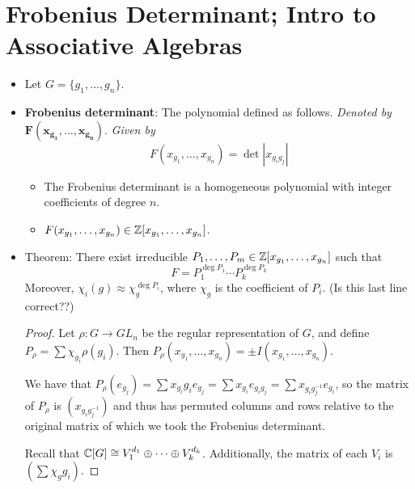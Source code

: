 \documentclass[../notes.tex]{subfiles}
\begin{document}
\section{Frobenius Determinant; Intro to Associative Algebras}
\begin{itemize}
    \item {}Let $G=\{g_1,\dots,g_n\}$.
    \item \textbf{Frobenius determinant}: The polynomial defined as follows. \emph{Denoted by} $\bm{F(x_{g_1},\ldots,x_{g_n})}$. \emph{Given by}
    \begin{equation*}
        F(x_{g_1},\dots,x_{g_n}) = \det|x_{g_ig_j}|
    \end{equation*}
    \begin{itemize}
        \item The Frobenius determinant is a homogeneous polynomial with integer coefficients of degree $n$.
        \item $F(x_{g_1},\dots,x_{g_n})\in\mathbb{Z}[x_{g_1},\dots,x_{g_n}]$.
    \end{itemize}
    \item Theorem: There exist irreducible $P_1,\dots,P_m\in\mathbb{Z}[x_{g_1},\dots,x_{g_n}]$ such that
    \begin{equation*}
        F = P_1^{\deg P_1}\cdots P_k^{\deg P_k}
    \end{equation*}
    Moreover, $\chi_i(g)\approx\chi_g^{\deg P_i}$, where $\chi_g$ is the coefficient of $P_i$. (Is this last line correct??)
    \begin{proof}
        Let $\rho:G\to GL_n$ be the regular representation of $G$, and define $P_\rho=\sum\chi_{g_i}\rho(g_i)$. Then $P_\rho(x_{g_1},\dots,x_{g_n})=\pm I(x_{g_1},\dots,x_{g_n})$.

        We have that $P_\rho(e_{g_j})=\sum x_{g_i}g_ie_{g_j}=\sum x_{g_i}e_{g_ig_j}=\sum x_{g_ig_j^{-1}}e_{g_i}$, so the matrix of $P_\rho$ is $(x_{g_ig_j^{-1}})$ and thus has permuted columns and rows relative to the original matrix of which we took the Frobenius determinant.

        Recall that $\mathbb{C}[G]\cong V_1^{d_1}\oplus\cdots\oplus V_k^{d_k}$. Additionally, the matrix of each $V_i$ is $(\sum\chi_gg_i)$.


\end{proof}
\end{itemize}
\end{document}
